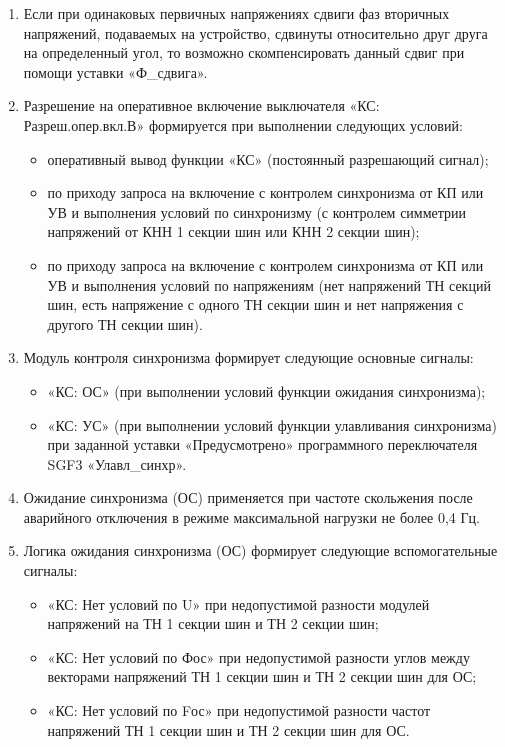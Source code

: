 \begin{enumerate}
\item
Если при одинаковых первичных напряжениях сдвиги фаз вторичных напряжений, подаваемых на устройство, сдвинуты относительно друг друга на определенный угол, то возможно скомпенсировать данный сдвиг при помощи уставки «Ф\_сдвига».

\item
Разрешение на оперативное включение выключателя «КС: Разреш.опер.вкл.В» формируется при выполнении следующих условий:
\begin{itemize}
    \item оперативный вывод функции «КС» (постоянный разрешающий сигнал);
    \item по приходу запроса на включение с контролем синхронизма от КП или УВ и выполнения условий по синхронизму (с контролем симметрии напряжений от КНН 1 секции шин или КНН 2 секции шин);
    \item по приходу запроса на включение с контролем синхронизма от КП или УВ и выполнения условий по напряжениям (нет напряжений ТН секций шин, есть напряжение с одного ТН секции шин и нет напряжения с другого ТН секции шин).
\end{itemize}

\item Модуль контроля синхронизма формирует следующие основные сигналы:
\begin{itemize}
    \item «КС: ОС» (при выполнении условий функции ожидания синхронизма);
    \item\sloppy «КС: УС» (при выполнении условий функции улавливания синхронизма) при заданной уставки «Предусмотрено» программного переключателя SGF3 «Улавл\_синхр».
\end{itemize}

\item
Ожидание синхронизма (ОС) применяется при частоте скольжения после аварийного отключения в режиме максимальной нагрузки не более 0,4 Гц.
\item Логика ожидания синхронизма (ОС) формирует следующие вспомогательные сигналы:
\begin{itemize}
    \item «КС: Нет условий по U» при недопустимой разности модулей напряжений на ТН 1 секции шин и ТН 2 секции шин;
    \item «КС: Нет условий по Фос» при недопустимой разности углов между векторами напряжений ТН 1 секции шин и ТН 2 секции шин для ОС;
    \item «КС: Нет условий по Fос» при недопустимой разности частот напряжений ТН 1 секции шин и ТН 2 секции шин для ОС.
\end{itemize}   


\end{enumerate}
